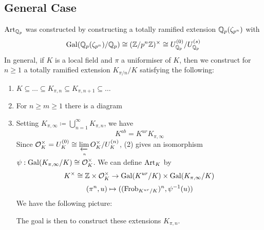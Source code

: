 \documentclass[10pt,a4paper]{article}
\begin{document}
\subsection{General Case}
$\operatorname{Art}_{\mathbb{Q}_p}$ was constructed by constructing a totally ramified extension $\mathbb{Q}_p(\zeta_{p^n})$ with
\[\operatorname{Gal}(\mathbb{Q}_p(\zeta_{p^n})/\mathbb{Q}_p) \cong (\mathbb{Z}/p^n\mathbb{Z})^\times \cong U_{\mathbb{Q}_p}^{(0)}/U_{\mathbb{Q}_p}^{(s)}\]
In general, if $K$ is a local field and $\pi$ a uniformiser of $K$, then we construct for $n\geq 1$ a totally ramified extension $K_{\pi/n}/K$ satisfying the following:
\begin{enumerate}
  \item $K \subseteq \ldots \subseteq K_{\pi, n} \subseteq K_{\pi, n+1} \subseteq \ldots$
  \item For $n\geq m \geq 1$ there is a diagram
  \begin{center}
  \end{center}
  \item  Setting $K_{\pi, \infty} \coloneqq \bigcup_{n=1}^\infty K_{\pi, n}$, we have
  \[K^{ab}= K^{ur}K_{\pi, \infty}\]
  Since $\mathcal{O}_K^\times = U_K^{(0)} \cong \lim\limits_{\xleftarrow[n]{}} O_K^\times/U_K^{(n)}$, (2) gives an isomorphism $\psi: \operatorname{Gal}(K_{\pi, \infty}/K) \cong \mathcal{O}_K^\times$. We can define $\operatorname{Art}_K$ by
  \[K^\times \cong \mathbb{Z} \times \mathcal{O}_K^\times \to \operatorname{Gal}(K^{ur}/K)\times \operatorname{Gal}(K_{\pi, \infty}/K)\]
  \[(\pi^n, u) \mapsto ((\operatorname{Frob}_{K^{ur}/K})^n, \psi^{-1}(u))\]
  We have the following picture:
  \begin{center}
  \end{center}
  The goal is then to construct these extensions $K_{\pi, n}$.
\end{enumerate}
\end{document}
